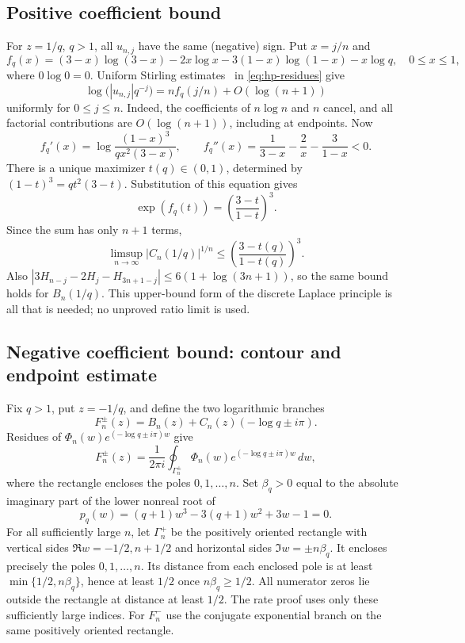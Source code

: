 \subsection{Positive coefficient bound}
For $z=1/q$, $q>1$, all $u_{n,j}$ have the same (negative) sign.  Put
$x=j/n$ and
\[
 f_q(x)=(3-x)\log(3-x)-2x\log x-3(1-x)\log(1-x)-x\log q,
 \quad 0\le x\le1,
\]
where $0\log0=0$.  Uniform Stirling estimates~\cite{WhittakerWatson} in
\eqref{eq:hp-residues} give
\[
 \log\bigl(|u_{n,j}|q^{-j}\bigr)=nf_q(j/n)+O(\log(n+1))
\]
uniformly for $0\le j\le n$.  Indeed, the coefficients of $n\log n$ and
$n$ cancel, and all factorial contributions are $O(\log(n+1))$,
including at endpoints.  Now
\[
 f_q'(x)=\log\frac{(1-x)^3}{q x^2(3-x)},\qquad
 f_q''(x)=\frac1{3-x}-\frac2x-\frac3{1-x}<0.
\]
There is a unique maximizer $t(q)\in(0,1)$, determined by
$(1-t)^3=qt^2(3-t)$.  Substitution of this equation gives
\[
 \exp(f_q(t))=\left(\frac{3-t}{1-t}\right)^3.
\]
Since the sum has only $n+1$ terms,
\[
 \limsup_{n\to\infty}|C_n(1/q)|^{1/n}
 \le \left(\frac{3-t(q)}{1-t(q)}\right)^3.
\]
Also $|3H_{n-j}-2H_j-H_{3n+1-j}|\le6(1+\log(3n+1))$, so the same bound
holds for $B_n(1/q)$.  This upper-bound form of the discrete Laplace
principle is all that is needed; no unproved ratio limit is used.

\subsection{Negative coefficient bound: contour and endpoint estimate}
Fix $q>1$, put $z=-1/q$, and define the two logarithmic branches
\[
 F_n^\pm(z)=B_n(z)+C_n(z)(-\log q\pm i\pi).
\]
Residues of $\Phi_n(w)e^{(-\log q\pm i\pi)w}$ give
\begin{equation}\label{eq:hp-contour-res}
 F_n^\pm(z)=\frac1{2\pi i}\oint_{\Gamma_n^\pm}
          \Phi_n(w)e^{(-\log q\pm i\pi)w}\,dw,
\end{equation}
where the rectangle encloses the poles $0,1,\ldots,n$.  Set $\beta_q>0$
equal to the absolute imaginary part of the lower nonreal root of
\begin{equation}\label{eq:hp-saddle-cubic}
 p_q(w)=(q+1)w^3-3(q+1)w^2+3w-1=0.
\end{equation}
For all sufficiently large $n$, let $\Gamma_n^+$ be the positively oriented
rectangle with vertical sides $\Re w=-1/2,n+1/2$ and horizontal sides
$\Im w=\pm n\beta_q$.  It encloses precisely the poles $0,1,\ldots,n$.
Its distance from each enclosed pole is at least
$\min\{1/2,n\beta_q\}$, hence at least $1/2$ once
$n\beta_q\ge1/2$.  All numerator zeros lie outside the rectangle at distance
at least $1/2$.  The rate proof uses only these sufficiently large indices.
For $F_n^-$ use the conjugate exponential branch on the same positively
oriented rectangle.


